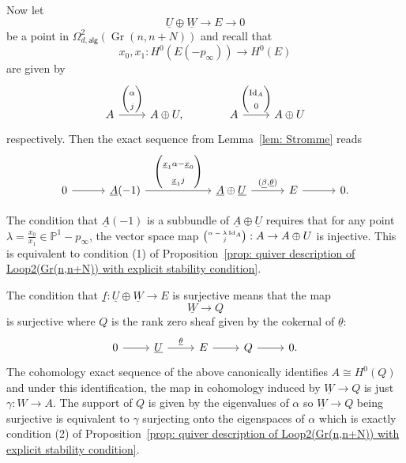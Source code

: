 \documentclass{amsart}
\theoremstyle{definition}
\newcommand{\PP}{\mathbb{P}}
\newcommand{\UL}[1]{\underline{#1}}
\newcommand{\alg}{\mathsf{alg}}
\newcommand{\Gr}{\operatorname{Gr}}
\newcommand{\LoopTwo}{\Omega^{2}_{d,\alg}}
\newcommand{\Id}{\operatorname{Id}}
\begin{document}
Now let 
\[
\UL{U} \oplus \UL{W} \to E \to 0
\]
be a point in $\LoopTwo (\Gr (n,n+N))$ and recall that 
\[
x_{0},x_{1}: H^{0}(E(-p_{\infty})) \to H^{0}(E)
\]
are given by
\[
\begin{tikzcd}
A \arrow{r}{\begin{pmatrix} \alpha \\ j  \end{pmatrix}} &A\oplus U,
\quad & A \arrow{r}{\begin{pmatrix} \Id_{A} \\ 0  \end{pmatrix}} &A\oplus U
\end{tikzcd}
\]
respectively. Then the exact sequence from Lemma~\ref{lem: Stromme}
reads
\begin{equation}\label{eqn: A(-1)->A+U->E}
\begin{tikzcd}[column sep=3em]
  0
    \arrow[r]
  & \UL{A}(-1)
    \arrow[rr,"{%
      \begin{pmatrix}
        \UL{x}_{1}\alpha - \UL{x}_{0} \\[3pt]
        \UL{x}_{1}j
      \end{pmatrix}
    }"]
  && \UL{A}\oplus \UL{U}
    \arrow[r,"{(\UL{\beta},\UL{\theta})}"]
  & E
    \arrow[r]
  & 0.
\end{tikzcd}
\end{equation}

The condition that $\UL{A}(-1)$ is a subbundle of $\UL{A}\oplus
\UL{U}$ requires that for any point $\lambda =\frac{x_{0}}{x_{1}}\in
\PP^{1}-p_{\infty}$, the vector space map ${\tiny \begin{pmatrix} \alpha -\lambda \Id_{A}\\
j \end{pmatrix}} : A\to A\oplus U $ is injective. This is equivalent
to condition (1) of Proposition~\ref{prop: quiver description of
Loop2(Gr(n,n+N)) with explicit stability condition}.

The condition that $\UL{f} :\UL{U}\oplus \UL{W} \to E$ is surjective
means that the map 
\[
\UL{W} \to Q
\]
is surjective where $Q$ is the rank zero sheaf given by the cokernal
of $\UL{\theta}$:
\[
\begin{tikzcd}
0\arrow[r]& \UL{U} \arrow{r}{\UL{\theta}} & E\arrow[r]&Q\arrow[r]&0.
\end{tikzcd}
\]
The cohomology exact sequence of the above canonically identifies
$A\cong H^{0}(Q)$ and under this identification, the map in cohomology
induced by $\UL{W}\to Q$ is just $\gamma :W\to A$. The support of $Q$
is given by the eigenvalues of $\alpha$ so $\UL{W}\to Q$ being
surjective is equivalent to $\gamma$ surjecting onto the eigenspaces
of $\alpha$ which is exactly condition (2) of Proposition~\ref{prop:
quiver description of Loop2(Gr(n,n+N)) with explicit stability
condition}.
\end{document}
